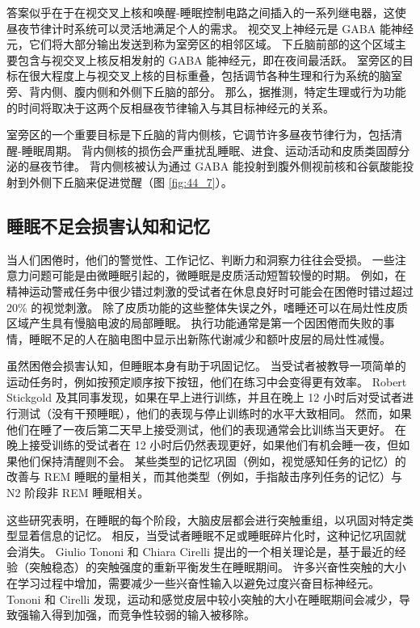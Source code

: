 答案似乎在于在视交叉上核和唤醒-睡眠控制电路之间插入的一系列继电器，这使昼夜节律计时系统可以灵活地满足个人的需求。
视交叉上神经元是 GABA 能神经元，它们将大部分输出发送到称为室旁区的相邻区域。
下丘脑前部的这个区域主要包含与视交叉上核反相发射的 GABA 能神经元，即在夜间最活跃。
室旁区的目标在很大程度上与视交叉上核的目标重叠，包括调节各种生理和行为系统的脑室旁、背内侧、腹内侧和外侧下丘脑的部分。
那么，据推测，特定生理或行为功能的时间将取决于这两个反相昼夜节律输入与其目标神经元的关系。


室旁区的一个重要目标是下丘脑的背内侧核，它调节许多昼夜节律行为，包括清醒-睡眠周期。
背内侧核的损伤会严重扰乱睡眠、进食、运动活动和皮质类固醇分泌的昼夜节律。
背内侧核被认为通过 GABA 能投射到腹外侧视前核和谷氨酸能投射到外侧下丘脑来促进觉醒（图 \ref{fig:44_7}）。


\subsection{睡眠不足会损害认知和记忆}

当人们困倦时，他们的警觉性、工作记忆、判断力和洞察力往往会受损。
一些注意力问题可能是由微睡眠引起的，微睡眠是皮质活动短暂较慢的时期。
例如，在精神运动警戒任务中很少错过刺激的受试者在休息良好时可能会在困倦时错过超过 20\% 的视觉刺激。
除了皮质功能的这些整体失误之外，嗜睡还可以在局灶性皮质区域产生具有慢脑电波的局部睡眠。
执行功能通常是第一个因困倦而失败的事情，睡眠不足的人在脑电图中显示出新陈代谢减少和额叶皮层的局灶性减慢。


虽然困倦会损害认知，但睡眠本身有助于巩固记忆。
当受试者被教导一项简单的运动任务时，例如按预定顺序按下按钮，他们在练习中会变得更有效率。
Robert Stickgold 及其同事发现，如果在早上进行训练，并且在晚上 12 小时后对受试者进行测试（没有干预睡眠），他们的表现与停止训练时的水平大致相同。
然而，如果他们在睡了一夜后第二天早上接受测试，他们的表现通常会比训练当天更好。
在晚上接受训练的受试者在 12 小时后仍然表现更好，如果他们有机会睡一夜，但如果他们保持清醒则不会。
某些类型的记忆巩固（例如，视觉感知任务的记忆）的改善与 REM 睡眠的量相关，而其他类型（例如，手指敲击序列任务的记忆）与 N2 阶段非 REM 睡眠相关。


这些研究表明，在睡眠的每个阶段，大脑皮层都会进行突触重组，以巩固对特定类型显着信息的记忆。
相反，当受试者睡眠不足或睡眠碎片化时，这种记忆巩固就会消失。
Giulio Tononi 和 Chiara Cirelli 提出的一个相关理论是，基于最近的经验（突触稳态）的突触强度的重新平衡发生在睡眠期间。
许多兴奋性突触的大小在学习过程中增加，需要减少一些兴奋性输入以避免过度兴奋目标神经元。
Tononi 和 Cirelli 发现，运动和感觉皮层中较小突触的大小在睡眠期间会减少，导致强输入得到加强，而竞争性较弱的输入被移除。


